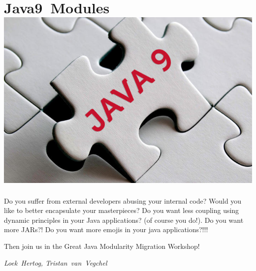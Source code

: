 
\section*{Java9~Modules\hfill\includegraphics[width=.35\linewidth]{images/java9-jigsaw.jpg}}

Do you suffer from external developers abusing your internal code? Would you like to better encapsulate your masterpieces? Do you want less coupling using dynamic principles in your Java applications? (of course you do!). Do you want more JARs?! Do you want more emojis in your java applications?!!!

Then join us in the Great Java Modularity Migration Workshop!

\hfill\textit{Loek~Hertog, Tristan~van~Vegchel}